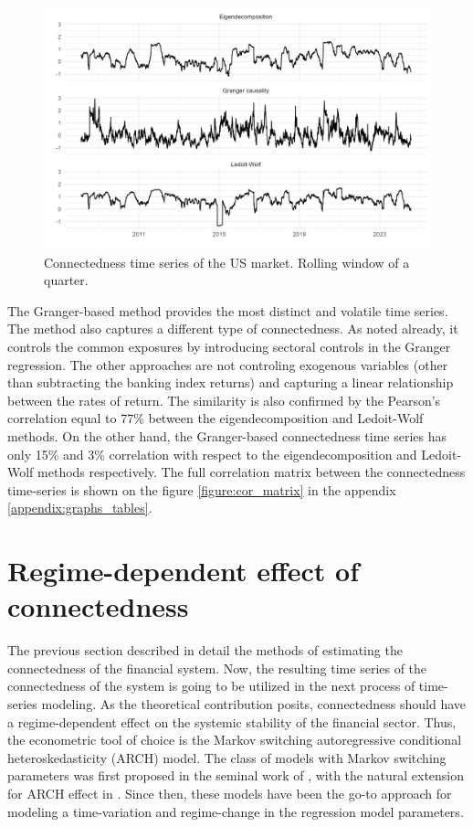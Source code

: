 \documentclass[12pt]{article}
\begin{document}
\begin{figure}
	\centering
	\includegraphics[scale = 0.76]{img/connect_ts.png}
	\caption{Connectedness time series of the US market. Rolling window of a quarter.}
	\label{figure:connect_ts}
\end{figure}

The Granger-based method provides the most distinct and volatile time series. The method also captures a different type of connectedness. As noted already, it controls the common exposures by introducing sectoral controls in the Granger regression. The other approaches are not controling exogenous variables (other than subtracting the banking index returns) and capturing a linear relationship between the rates of return. The similarity is also confirmed by the Pearson's correlation equal to 77\% between the eigendecomposition and Ledoit-Wolf methods. On the other hand, the Granger-based connectedness time series has only 15\% and 3\% correlation with respect to the eigendecomposition and Ledoit-Wolf methods respectively. The full correlation matrix between the connectedness time-series is shown on the figure \ref{figure:cor_matrix} in the appendix \ref{appendix:graphs_tables}.

\section{Regime-dependent effect of connectedness}\label{section:arch_model}

The previous section described in detail the methods of estimating the connectedness of the financial system. Now, the resulting time series of the connectedness of the system is going to be utilized in the next process of time-series modeling. As the theoretical contribution posits, connectedness should have a regime-dependent effect on the systemic stability of the financial sector. Thus, the econometric tool of choice is the Markov switching autoregressive conditional heteroskedasticity (ARCH) model. The class of models with Markov switching parameters was first proposed in the seminal work of \citet{hamilton89}, with the natural extension for ARCH effect in \citet{cai94}. Since then, these models have been the go-to approach for modeling a time-variation and regime-change in the regression model parameters. 
\end{document}
